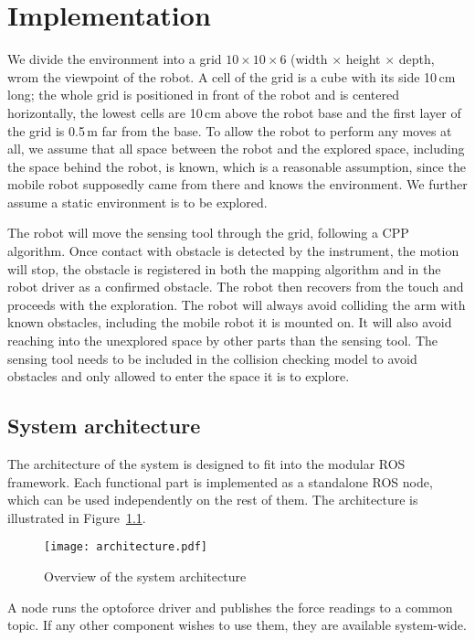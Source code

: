 \documentclass[buriama8_dp.tex]{subfiles}
\begin{document}
\chapter{Implementation}

We divide the environment into a grid \(10 \times 10 \times 6\) (width \(\times\) height \(\times\) depth, wrom the viewpoint of the robot. A cell of the grid is a cube with its side 10\,cm long; the whole grid is positioned in front of the robot and is centered horizontally, the lowest cells are 10\,cm above the robot base and the first layer of the grid is 0.5\,m far from the base. To allow the robot to perform any moves at all, we assume that all space between the robot and the explored space, including the space behind the robot, is known, which is a reasonable assumption, since the mobile robot supposedly came from there and knows the environment. We further assume a static environment is to be explored.

The robot will move the sensing tool through the grid, following a CPP algorithm. Once contact with obstacle is detected by the instrument, the motion will stop, the obstacle is registered in both the mapping algorithm and in the robot driver as a confirmed obstacle. The robot then recovers from the touch and proceeds with the exploration. The robot will always avoid colliding the arm with known obstacles, including the mobile robot it is mounted on. It will also avoid reaching into the unexplored space by other parts than the sensing tool. The sensing tool needs to be included in the collision checking model to avoid obstacles and only allowed to enter the space it is to explore.

\section{System architecture}
\label{sec:impl_arch}

The architecture of the system is designed to fit into the modular ROS framework. Each functional part is implemented as a standalone ROS node, which can be used independently on the rest of them. The architecture is illustrated in Figure~\ref{fig:arch}.

\begin{figure}[ht]
  \centering
  \texttt{[image: architecture.pdf]}
  \caption{Overview of the system architecture}
  \label{fig:arch}
\end{figure}



A node runs the optoforce driver and publishes the force readings to a common topic. If any other component wishes to use them, they are available system-wide.
\end{document}
